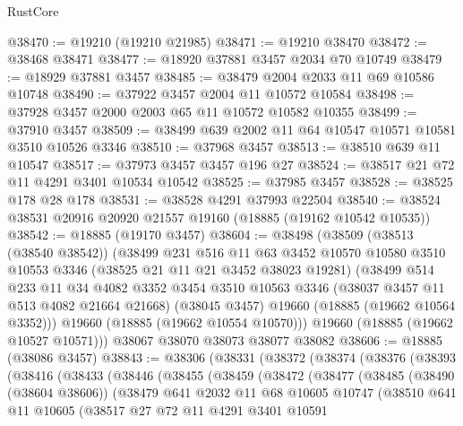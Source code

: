 \begin{lexlean}{RustCore}
\begin{coremodule}
@38470 := @19210 (@19210 @21985)
@38471 := @19210 @38470
@38472 := @38468 @38471
@38477 := @18920 @37881 @3457 @2034 @70 @10749
@38479 := @18929 @37881 @3457
@38485 := @38479 @2004 @2033 @11 @69 @10586 @10748
@38490 := @37922 @3457 @2004 @11 @10572 @10584
@38498 := @37928 @3457 @2000 @2003 @65 @11 @10572 @10582 @10355
@38499 := @37910 @3457
@38509 := @38499 @639 @2002 @11 @64 @10547 @10571 @10581 @3510 @10526 @3346
@38510 := @37968 @3457
@38513 := @38510 @639 @11 @10547
@38517 := @37973 @3457 @3457 @196 @27
@38524 := @38517 @21 @72 @11 @4291 @3401 @10534 @10542
@38525 := @37985 @3457
@38528 := @38525 @178 @28 @178
@38531 := @38528 @4291 @37993 @22504
@38540 := @38524 @38531 @20916 @20920 @21557 @19160 (@18885 (@19162 @10542 @10535))
@38542 := @18885 (@19170 @3457)
@38604 := @38498
    (@38509
      (@38513 (@38540 @38542))
      (@38499
        @231
        @516
        @11
        @63
        @3452
        @10570
        @10580
        @3510
        @10553
        @3346
        (@38525 @21 @11 @21 @3452 @38023 @19281)
        (@38499
          @514
          @233
          @11
          @34
          @4082
          @3352
          @3454
          @3510
          @10563
          @3346
          (@38037 @3457 @11 @513 @4082 @21664 @21668)
          (@38045 @3457)
          @19660
          (@18885 (@19662 @10564 @3352)))
        @19660
        (@18885 (@19662 @10554 @10570)))
      @19660
      (@18885 (@19662 @10527 @10571)))
    @38067
    @38070
    @38073
    @38077
    @38082
@38606 := @18885 (@38086 @3457)
@38843 := @38306
    (@38331
      (@38372
        (@38374
          (@38376
            (@38393
              (@38416
                (@38433
                  (@38446
                    (@38455
                      (@38459
                        (@38472
                          (@38477
                            (@38485
                              (@38490 (@38604 @38606))
                              (@38479
                                @641
                                @2032
                                @11
                                @68
                                @10605
                                @10747
                                (@38510
                                  @641
                                  @11
                                  @10605
                                  (@38517
                                    @27
                                    @72
                                    @11
                                    @4291
                                    @3401
                                    @10591

\end{coremodule}
\end{lexlean}
